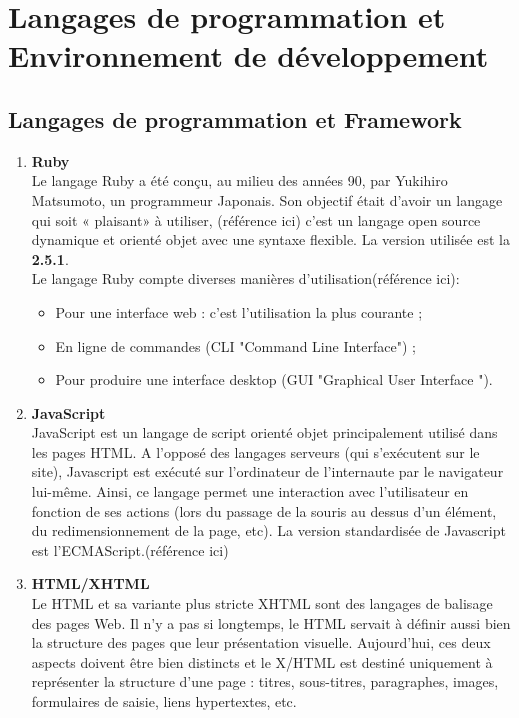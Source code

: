 \documentclass[14pt,openany]{report}%
\begin{document}
\section{Langages de programmation et Environnement de développement}
	\subsection{Langages de programmation et Framework}
 \begin{enumerate}
 	\item \textbf{Ruby}\\
 	Le langage Ruby a été conçu, au milieu des années 90, par Yukihiro Matsumoto, un
 	programmeur Japonais. Son objectif était d’avoir un langage qui soit « plaisant» à
 	utiliser, (référence ici) c'est un langage open source dynamique et orienté objet avec une syntaxe flexible. La version utilisée est la \textbf{2.5.1}.\\
 	
 \indent	Le langage Ruby compte diverses manières d’utilisation(référence ici):
 	\begin{itemize}
 		\item Pour une interface web : c’est l’utilisation la plus courante ;
 		\item En ligne de commandes (CLI "Command Line Interface") ;
 		\item Pour produire une interface desktop (GUI "Graphical User Interface ").\\
 	\end{itemize}
   	\item \textbf{JavaScript}\\
   	JavaScript est un langage de script orienté objet principalement utilisé dans les pages HTML.
   	A l’opposé des langages serveurs (qui s’exécutent sur le site), Javascript est exécuté sur l’ordinateur de l’internaute par le navigateur lui-même. Ainsi, ce langage permet une interaction
   	avec l’utilisateur en fonction de ses actions (lors du passage de la souris au dessus d’un élément,
   	du redimensionnement de la page, etc). La version standardisée de Javascript est l’ECMAScript.(référence ici)\\
   	\item \textbf{HTML/XHTML}\\
   	 Le HTML et sa variante plus stricte XHTML sont des langages de balisage 
   	des   pages  Web.  Il  n’y  a  pas  si  longtemps,  le  HTML  servait  à  définir  aussi  bien  la 
   	structure des pages que leur présentation visuelle. Aujourd'hui, ces deux aspects doivent 
   	être bien distincts et le X/HTML est destiné uniquement à représenter la structure d’une 
   	page : titres, sous-titres, paragraphes, images, formulaires de saisie, liens hypertextes, 
   	etc.\\
   	

\end{enumerate}
\end{document}
